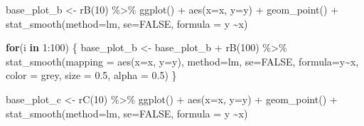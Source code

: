 \documentclass[
]{book}
\newenvironment{Shaded}{\begin{snugshade}}{\end{snugshade}}
\newcommand{\AttributeTok}[1]{\textcolor[rgb]{0.77,0.63,0.00}{#1}}
\newcommand{\ConstantTok}[1]{\textcolor[rgb]{0.00,0.00,0.00}{#1}}
\newcommand{\ControlFlowTok}[1]{\textcolor[rgb]{0.13,0.29,0.53}{\textbf{#1}}}
\newcommand{\DecValTok}[1]{\textcolor[rgb]{0.00,0.00,0.81}{#1}}
\newcommand{\FloatTok}[1]{\textcolor[rgb]{0.00,0.00,0.81}{#1}}
\newcommand{\FunctionTok}[1]{\textcolor[rgb]{0.00,0.00,0.00}{#1}}
\newcommand{\NormalTok}[1]{#1}
\newcommand{\OtherTok}[1]{\textcolor[rgb]{0.56,0.35,0.01}{#1}}
\newcommand{\SpecialCharTok}[1]{\textcolor[rgb]{0.00,0.00,0.00}{#1}}
\newcommand{\StringTok}[1]{\textcolor[rgb]{0.31,0.60,0.02}{#1}}
\theoremstyle{definition}
\theoremstyle{definition}
\theoremstyle{definition}
\theoremstyle{definition}
\theoremstyle{remark}
\begin{document}
\begin{Shaded}
\begin{Highlighting}[]
\NormalTok{base\_plot\_b }\OtherTok{\textless{}{-}} \FunctionTok{rB}\NormalTok{(}\DecValTok{10}\NormalTok{) }\SpecialCharTok{\%\textgreater{}\%}  
  \FunctionTok{ggplot}\NormalTok{() }\SpecialCharTok{+} 
  \FunctionTok{aes}\NormalTok{(}\AttributeTok{x=}\NormalTok{x, }\AttributeTok{y=}\NormalTok{y) }\SpecialCharTok{+} 
  \FunctionTok{geom\_point}\NormalTok{() }\SpecialCharTok{+} 
  \FunctionTok{stat\_smooth}\NormalTok{(}\AttributeTok{method=}\StringTok{\textquotesingle{}lm\textquotesingle{}}\NormalTok{, }\AttributeTok{se=}\ConstantTok{FALSE}\NormalTok{, }\AttributeTok{formula =} \StringTok{\textquotesingle{}y \textasciitilde{}x\textquotesingle{}}\NormalTok{)}

\ControlFlowTok{for}\NormalTok{(i }\ControlFlowTok{in} \DecValTok{1}\SpecialCharTok{:}\DecValTok{100}\NormalTok{) \{ }
\NormalTok{    base\_plot\_b }\OtherTok{\textless{}{-}}\NormalTok{ base\_plot\_b }\SpecialCharTok{+} \FunctionTok{rB}\NormalTok{(}\DecValTok{100}\NormalTok{) }\SpecialCharTok{\%\textgreater{}\%} 
      \FunctionTok{stat\_smooth}\NormalTok{(}\AttributeTok{mapping =} \FunctionTok{aes}\NormalTok{(}\AttributeTok{x=}\NormalTok{x, }\AttributeTok{y=}\NormalTok{y), }\AttributeTok{method=}\StringTok{\textquotesingle{}lm\textquotesingle{}}\NormalTok{, }\AttributeTok{se=}\ConstantTok{FALSE}\NormalTok{, }\AttributeTok{formula=}\StringTok{\textquotesingle{}y\textasciitilde{}x\textquotesingle{}}\NormalTok{, }\AttributeTok{color =} \StringTok{\textquotesingle{}grey\textquotesingle{}}\NormalTok{, }\AttributeTok{size =} \FloatTok{0.5}\NormalTok{, }\AttributeTok{alpha =} \FloatTok{0.5}\NormalTok{)}
\NormalTok{  \}}

\NormalTok{base\_plot\_c }\OtherTok{\textless{}{-}} \FunctionTok{rC}\NormalTok{(}\DecValTok{10}\NormalTok{) }\SpecialCharTok{\%\textgreater{}\%}  
  \FunctionTok{ggplot}\NormalTok{() }\SpecialCharTok{+} 
  \FunctionTok{aes}\NormalTok{(}\AttributeTok{x=}\NormalTok{x, }\AttributeTok{y=}\NormalTok{y) }\SpecialCharTok{+} 
  \FunctionTok{geom\_point}\NormalTok{() }\SpecialCharTok{+} 
  \FunctionTok{stat\_smooth}\NormalTok{(}\AttributeTok{method=}\StringTok{\textquotesingle{}lm\textquotesingle{}}\NormalTok{, }\AttributeTok{se=}\ConstantTok{FALSE}\NormalTok{, }\AttributeTok{formula =} \StringTok{\textquotesingle{}y \textasciitilde{}x\textquotesingle{}}\NormalTok{)}


\end{Highlighting}
\end{Shaded}
\end{document}
